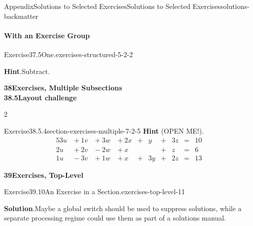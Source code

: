 \documentclass[twoside,10pt,]{article}
\newcommand{\blocktitlefont}{\relax}
\numberwithin{equation}{section}
\newcommand{\amp}{&}
\begin{document}
\begin{solutions-section}{Appendix}{Solutions to Selected Exercises}{}{Solutions to Selected Exercises}{}{}{solutions-backmatter}
\paragraph[{With an Exercise Group}]{With an Exercise Group}
\begin{exercisegroup}
\begin{divisionsolutioneg}{Exercise}{37.5}{One.}{exercises-structured-5-2-2}%
\par\smallskip%
\noindent\textbf{\blocktitlefont Hint}.\hypertarget{exercises-structured-5-2-2-3-back}{}\quad{}Subtract.%
\end{divisionsolutioneg}%
\end{exercisegroup}
\par\medskip\noindent
\par\medskip\noindent
\par\medskip
\noindent\textbf{\large{}38\space\textperiodcentered\space{}Exercises, Multiple Subsections\\
38.5\space\textperiodcentered\space{}Layout challenge}
\begin{exercisegroupcol}{2}
\begin{divisionsolutionegcol}{Exercise}{38.5.4}{}{section-exercises-multiple-7-2-5}%
\noindent\textbf{\blocktitlefont Hint} (OPEN ME!).\hypertarget{section-exercises-multiple-7-2-5-2-back}{}\quad{}%
\begin{alignat*}{5}
3u \amp {}+{} 1v \amp {}+{} 3w \amp {}+{} 2x \amp {}+{} \amp  y \amp {}+{} \amp 3z \amp {}={} \amp 10\\
2u \amp {}+{} 2v \amp {}-{} 2w \amp {}+{} x  \amp       \amp    \amp {}+{} \amp  z \amp {}={} \amp 6\\
1u \amp {}-{} 3v \amp {}+{} 1w \amp {}+{} x  \amp {}+{} \amp 3y \amp {}+{} \amp 2z \amp {}={} \amp 13
\end{alignat*}
\end{divisionsolutionegcol}%
\end{exercisegroupcol}
\par\medskip\noindent
\par\medskip
\noindent\textbf{\large{}39\space\textperiodcentered\space{}Exercises, Top-Level}
\begin{divisionsolution}{Exercise}{39.10}{An Exercise in a Section.}{exercises-top-level-11}%
\par\smallskip%
\noindent\textbf{\blocktitlefont Solution}.\hypertarget{exercises-top-level-11-3-back}{}\quad{}Maybe a global switch should be used to suppress solutions, while a separate processing regime could use them as part of a solutions manual.%

\end{divisionsolution}
\end{solutions-section}
\end{document}

